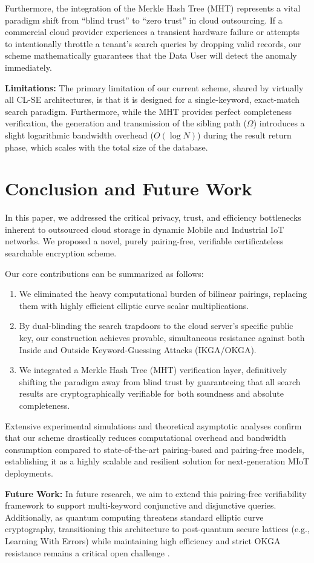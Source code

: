 \documentclass[10pt,journal,compsoc]{IEEEtran}
\begin{document}
Furthermore, the integration of the Merkle Hash Tree (MHT) represents a vital paradigm shift from ``blind trust'' to ``zero trust'' in cloud outsourcing. If a commercial cloud provider experiences a transient hardware failure or attempts to intentionally throttle a tenant's search queries by dropping valid records, our scheme mathematically guarantees that the Data User will detect the anomaly immediately.

\textbf{Limitations:} The primary limitation of our current scheme, shared by virtually all CL-SE architectures, is that it is designed for a single-keyword, exact-match search paradigm. Furthermore, while the MHT provides perfect completeness verification, the generation and transmission of the sibling path ($\Omega$) introduces a slight logarithmic bandwidth overhead ($O(\log N)$) during the result return phase, which scales with the total size of the database.

\section{Conclusion and Future Work}\label{sec:conclusion}
In this paper, we addressed the critical privacy, trust, and efficiency bottlenecks inherent to outsourced cloud storage in dynamic Mobile and Industrial IoT networks. We proposed a novel, purely pairing-free, verifiable certificateless searchable encryption scheme. 

Our core contributions can be summarized as follows:
\begin{enumerate}
    \item We eliminated the heavy computational burden of bilinear pairings, replacing them with highly efficient elliptic curve scalar multiplications.
    \item By dual-blinding the search trapdoors to the cloud server's specific public key, our construction achieves provable, simultaneous resistance against both Inside and Outside Keyword-Guessing Attacks (IKGA/OKGA).
    \item We integrated a Merkle Hash Tree (MHT) verification layer, definitively shifting the paradigm away from blind trust by guaranteeing that all search results are cryptographically verifiable for both soundness and absolute completeness.
\end{enumerate}

Extensive experimental simulations and theoretical asymptotic analyses confirm that our scheme drastically reduces computational overhead and bandwidth consumption compared to state-of-the-art pairing-based and pairing-free models, establishing it as a highly scalable and resilient solution for next-generation MIoT deployments.

\textbf{Future Work:} In future research, we aim to extend this pairing-free verifiability framework to support multi-keyword conjunctive and disjunctive queries. Additionally, as quantum computing threatens standard elliptic curve cryptography, transitioning this architecture to post-quantum secure lattices (e.g., Learning With Errors) while maintaining high efficiency and strict OKGA resistance remains a critical open challenge \cite{lu2023certificateless}.



\end{document}
